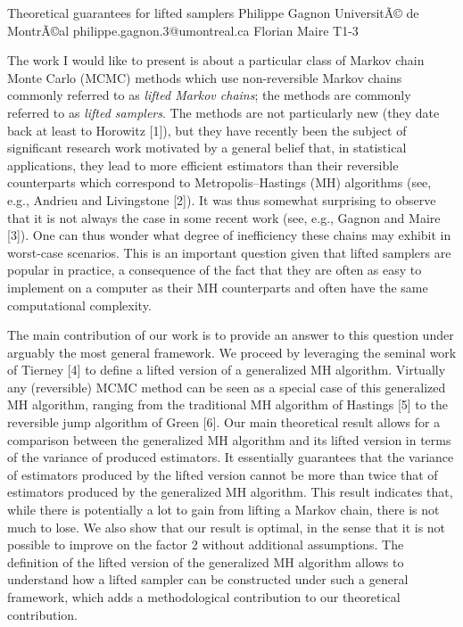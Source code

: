\begin{talk}
  {Theoretical guarantees for lifted samplers}%
  {Philippe Gagnon}%
  {UniversitÃ© de MontrÃ©al}%
  {philippe.gagnon.3@umontreal.ca}%
  {Florian Maire}%
  {T1-3}%
			
The work I would like to present is about a particular class of Markov chain Monte Carlo (MCMC) methods which use non-reversible Markov chains commonly referred to as \textit{lifted Markov chains}; the methods are commonly referred to as \textit{lifted samplers}. The methods are not particularly new (they date back at least to Horowitz [1]), but they have recently been the subject of significant research work motivated by a general belief that, in statistical applications, they lead to more efficient estimators than their reversible counterparts which correspond to Metropolis--Hastings (MH) algorithms (see, e.g., Andrieu and Livingstone [2]). It was thus somewhat surprising to observe that it is not always the case in some recent work (see, e.g., Gagnon and Maire [3]). One can thus wonder what degree of inefficiency these chains may exhibit in worst-case scenarios. This is an important question given that lifted samplers are popular in practice, a consequence of the fact that they are often as easy to implement on a computer as their MH counterparts and often have the same computational complexity.

The main contribution of our work is to provide an answer to this question under arguably the most general framework. We proceed by leveraging the seminal work of Tierney [4] to define a lifted version of a generalized MH algorithm. Virtually any (reversible) MCMC method can be seen as a special case of this generalized MH algorithm, ranging from the traditional MH algorithm of Hastings [5] to the reversible jump algorithm of Green [6]. Our main theoretical result allows for a comparison between the generalized MH algorithm and its lifted version in terms of the variance of produced estimators. It essentially guarantees that the variance of estimators produced by the lifted version cannot be more than twice that of estimators produced by the generalized MH algorithm. This result indicates that, while there is potentially a lot to gain from lifting a Markov chain, there is not much to lose. We also show that our result is optimal, in the sense that it is not possible to improve on the factor 2 without additional assumptions. The definition of the lifted version of the generalized MH algorithm allows to understand how a lifted sampler can be constructed under such a general framework, which adds a methodological contribution to our theoretical contribution.


\end{talk}
